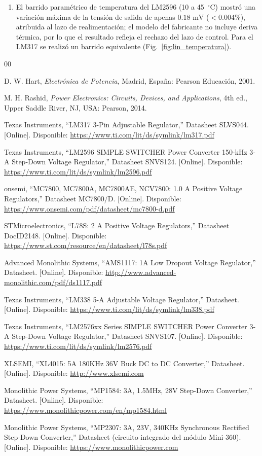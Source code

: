 \documentclass[conference]{IEEEtran}
\begin{document}
\begin{enumerate}
    \item El barrido paramétrico de temperatura del LM2596 (10 a 45~$^{\circ}$C) mostró una variación máxima de la tensión de salida de apenas $0.18\text{ mV}$ ($<0.004\%$), atribuida al lazo de realimentación; el modelo del fabricante no incluye deriva térmica, por lo que el resultado refleja el rechazo del lazo de control. Para el LM317 se realizó un barrido equivalente (Fig.~\ref{fig:lin_temperatura}).
\end{enumerate}

\begin{thebibliography}{00}

D. W. Hart, \textit{Electrónica de Potencia}, Madrid, España: Pearson Educación, 2001.

M. H. Rashid, \textit{Power Electronics: Circuits, Devices, and Applications}, 4th ed., Upper Saddle River, NJ, USA: Pearson, 2014.

Texas Instruments, ``LM317 3-Pin Adjustable Regulator,'' Datasheet SLVS044. [Online]. Disponible: \url{https://www.ti.com/lit/ds/symlink/lm317.pdf}

Texas Instruments, ``LM2596 SIMPLE SWITCHER Power Converter 150-kHz 3-A Step-Down Voltage Regulator,'' Datasheet SNVS124. [Online]. Disponible: \url{https://www.ti.com/lit/ds/symlink/lm2596.pdf}

onsemi, ``MC7800, MC7800A, MC7800AE, NCV7800: 1.0 A Positive Voltage Regulators,'' Datasheet MC7800/D. [Online]. Disponible: \url{https://www.onsemi.com/pdf/datasheet/mc7800-d.pdf}

STMicroelectronics, ``L78S: 2 A Positive Voltage Regulators,'' Datasheet DocID2148. [Online]. Disponible: \url{https://www.st.com/resource/en/datasheet/l78s.pdf}

Advanced Monolithic Systems, ``AMS1117: 1A Low Dropout Voltage Regulator,'' Datasheet. [Online]. Disponible: \url{http://www.advanced-monolithic.com/pdf/ds1117.pdf}

Texas Instruments, ``LM338 5-A Adjustable Voltage Regulator,'' Datasheet. [Online]. Disponible: \url{https://www.ti.com/lit/ds/symlink/lm338.pdf}

Texas Instruments, ``LM2576xx Series SIMPLE SWITCHER Power Converter 3-A Step-Down Voltage Regulator,'' Datasheet SNVS107. [Online]. Disponible: \url{https://www.ti.com/lit/ds/symlink/lm2576.pdf}

XLSEMI, ``XL4015: 5A 180KHz 36V Buck DC to DC Converter,'' Datasheet. [Online]. Disponible: \url{http://www.xlsemi.com}

Monolithic Power Systems, ``MP1584: 3A, 1.5MHz, 28V Step-Down Converter,'' Datasheet. [Online]. Disponible: \url{https://www.monolithicpower.com/en/mp1584.html}

Monolithic Power Systems, ``MP2307: 3A, 23V, 340KHz Synchronous Rectified Step-Down Converter,'' Datasheet (circuito integrado del módulo Mini-360). [Online]. Disponible: \url{https://www.monolithicpower.com}

\end{thebibliography}
\end{document}
